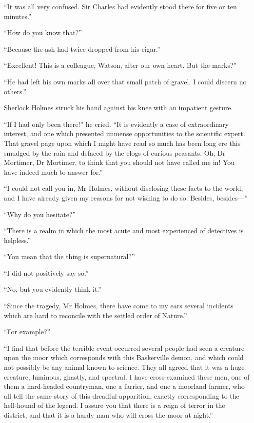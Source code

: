 \documentclass[paper=a5,BCOR=7mm,twoside,DIV=calc,12pt,usegeometry,openany,chapterprefix,endperiod,headings=big]{scrbook} %
\begin{document}
\enquote{It was all very confused. Sir Charles had evidently stood there for five or ten minutes.}

\enquote{How do you know that?}

\enquote{Because the ash had twice dropped from his cigar.}

\enquote{Excellent! This is a colleague, Watson, after our own heart. But the marks?}

\enquote{He had left his own marks all over that small patch of gravel. I could discern no others.}

Sherlock Holmes struck his hand against his knee with an impatient gesture.

\enquote{If I had only been there!} he cried. \enquote{It is evidently a case of extraordinary interest, and one which presented immense opportunities to the scientific expert. That gravel page upon which I might have read so much has been long ere this smudged by the rain and defaced by the clogs of curious peasants. Oh, Dr Mortimer, Dr Mortimer, to think that you should not have called me in! You have indeed much to answer for.}

%

\enquote{I could not call you in, Mr Holmes, without disclosing these facts to the world, and I have already given my reasons for not wishing to do so. Besides, besides---}

\enquote{Why do you hesitate?}

\enquote{There is a realm in which the most acute and most experienced of detectives is helpless.}

\enquote{You mean that the thing is supernatural?}

\enquote{I did not positively say so.}

\enquote{No, but you evidently think it.}

\enquote{Since the tragedy, Mr Holmes, there have come to my ears several incidents which are hard to reconcile with the settled order of Nature.}

\enquote{For example?}

\enquote{I find that before the terrible event occurred several people had seen a creature upon the moor which corresponds with this Baskerville demon, and which could not possibly be any animal known to science. They all agreed that it was a huge creature, luminous, ghastly, and spectral. I have cross-examined these men, one of them a hard-headed countryman, one a farrier, and one a moorland farmer, who all tell the same story of this dreadful apparition, exactly corresponding to the hell-hound of the legend. I assure you that there is a reign of terror in the district, and that it is a hardy man who will cross the moor at night.}
\end{document}
